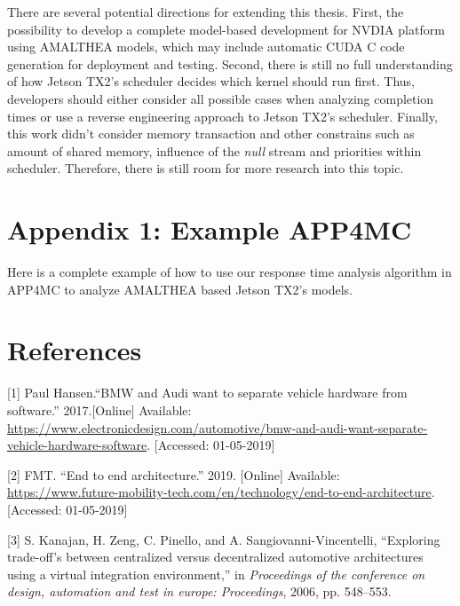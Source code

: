 \documentclass[
  12pt,
  a4paperpaper,
]{report}
\begin{document}
There are several potential directions for extending this thesis. First,
the possibility to develop a complete model-based development for NVDIA
platform using AMALTHEA models, which may include automatic CUDA C code
generation for deployment and testing. Second, there is still no full
understanding of how Jetson TX2's scheduler decides which kernel should
run first. Thus, developers should either consider all possible cases
when analyzing completion times or use a reverse engineering approach to Jetson TX2's
scheduler. Finally, this work didn't consider memory transaction and other
constrains such as amount of shared memory, influence of the \emph{null}
stream and priorities within scheduler. Therefore, there is still room
for more research into this topic.

\hypertarget{appendix-1-example-app4mc}{%
\chapter*{Appendix 1: Example APP4MC}\label{appendix-1-example-app4mc}}

Here is a complete example of how to use our response time analysis
algorithm in APP4MC to analyze AMALTHEA based Jetson TX2's models.



\footnotesize

\hypertarget{references}{%
\chapter*{References}\label{references}}

\hypertarget{refs}{}
\leavevmode\hypertarget{ref-Hansen2019}{}%
{[}1{]} Paul Hansen.``BMW and Audi want to separate vehicle hardware from
software.'' 2017.[Online] Available:
\url{https://www.electronicdesign.com/automotive/bmw-and-audi-want-separate-vehicle-hardware-software}. [Accessed: 01-05-2019]

\leavevmode\hypertarget{ref-Future2019}{}%
{[}2{]} FMT. ``End to end architecture.'' 2019. [Online] Available: 
\url{https://www.future-mobility-tech.com/en/technology/end-to-end-architecture}. [Accessed: 01-05-2019]

\leavevmode\hypertarget{ref-Kanajan2006}{}%
{[}3{]} S. Kanajan, H. Zeng, C. Pinello, and A. Sangiovanni-Vincentelli,
``Exploring trade-off's between centralized versus decentralized
automotive architectures using a virtual integration environment,'' in
\emph{Proceedings of the conference on design, automation and test in
europe: Proceedings}, 2006, pp. 548--553.
\end{document}
